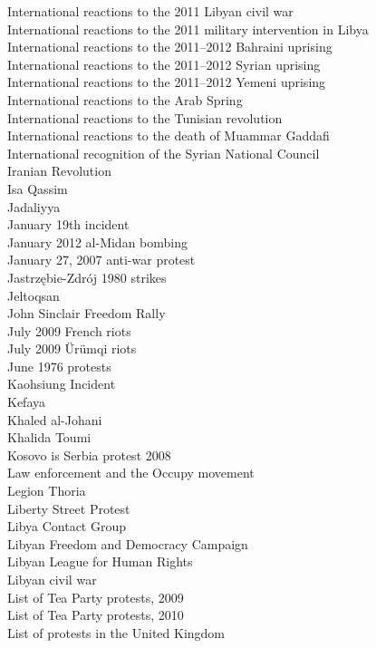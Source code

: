 International reactions to the 2011 Libyan civil war\\
International reactions to the 2011 military intervention in Libya\\
International reactions to the 2011–2012 Bahraini uprising\\
International reactions to the 2011–2012 Syrian uprising\\
International reactions to the 2011–2012 Yemeni uprising\\
International reactions to the Arab Spring\\
International reactions to the Tunisian revolution\\
International reactions to the death of Muammar Gaddafi\\
International recognition of the Syrian National Council\\
Iranian Revolution\\
Isa Qassim\\
Jadaliyya\\
January 19th incident\\
January 2012 al-Midan bombing\\
January 27, 2007 anti-war protest\\
Jastrzębie-Zdrój 1980 strikes\\
Jeltoqsan\\
John Sinclair Freedom Rally\\
July 2009 French riots\\
July 2009 Ürümqi riots\\
June 1976 protests\\
Kaohsiung Incident\\
Kefaya\\
Khaled al-Johani\\
Khalida Toumi\\
Kosovo is Serbia protest 2008\\
Law enforcement and the Occupy movement\\
Legion Thoria\\
Liberty Street Protest\\
Libya Contact Group\\
Libyan Freedom and Democracy Campaign\\
Libyan League for Human Rights\\
Libyan civil war\\
List of Tea Party protests, 2009\\
List of Tea Party protests, 2010\\
List of protests in the United Kingdom\\
